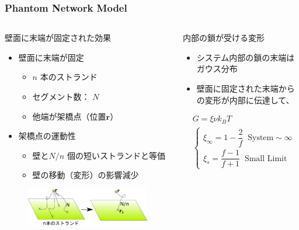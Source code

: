 \documentclass[11pt, dvipdfmx]{beamer}
\begin{document}
\begin{frame}
\frametitle{Phantom Network Model}
\begin{columns}[totalwidth=1\textwidth]
\begin{block}{壁面に末端が固定された効果}
\begin{itemize}
\item
壁面に末端が固定
	\begin{itemize}
	\item  
	$n$ 本のストランド
	\item
	セグメント数： $N$
	\item
	他端が架橋点（位置$\bm{r}$）
	\end{itemize}
\item
架橋点の運動性
	\begin{itemize}
	\item  
	壁と$N/n$ 個の短いストランドと等価
	\item
	壁の移動（変形）の影響減少
	\end{itemize}
\end{itemize}
\vspace{-2mm}
\begin{figure}
\centering
\includegraphics[width=\textwidth]{./fig/phantom-1.png}
\end{figure}
\end{block}
\begin{exampleblock}{内部の鎖が受ける変形}
\begin{itemize}
\item
システム内部の鎖の末端はガウス分布
\item
壁面に固定された末端からの変形が内部に伝達して、
\end{itemize}
\vspace{-5mm}
\tiny
\begin{align*}
&G=\xi \nu k_BT \\
&\begin{cases}
\xi_{\infty} = 1-\dfrac{2}{f} \;\; \text{System}\sim \infty \\[8pt]
\xi_{s} = \dfrac{f-1}{f+1} \;\; \text{Small Limit}
\end{cases}

\end{align*}
\end{exampleblock}
\end{columns}
\end{frame}
\end{document}
